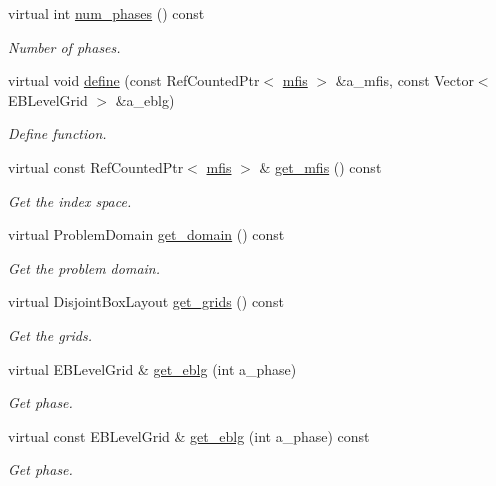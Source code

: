 \begin{DoxyCompactItemize}
virtual int \hyperlink{classMFLevelGrid_aa734d454aa492ca0d1a7ab1f0f7fbc58}{num\+\_\+phases} () const 
\begin{DoxyCompactList}\small\item\em Number of phases. \end{DoxyCompactList}\item 
virtual void \hyperlink{classMFLevelGrid_ae7cb324811b71bd16b4aa374c5fce1f9}{define} (const Ref\+Counted\+Ptr$<$ \hyperlink{classmfis}{mfis} $>$ \&a\+\_\+mfis, const Vector$<$ E\+B\+Level\+Grid $>$ \&a\+\_\+eblg)
\begin{DoxyCompactList}\small\item\em Define function. \end{DoxyCompactList}\item 
virtual const Ref\+Counted\+Ptr$<$ \hyperlink{classmfis}{mfis} $>$ \& \hyperlink{classMFLevelGrid_ac09adf47fdbff03d6eb3ae309212de44}{get\+\_\+mfis} () const 
\begin{DoxyCompactList}\small\item\em Get the index space. \end{DoxyCompactList}\item 
virtual Problem\+Domain \hyperlink{classMFLevelGrid_a43e3fce3f68c0ba93e67241928b2ba51}{get\+\_\+domain} () const 
\begin{DoxyCompactList}\small\item\em Get the problem domain. \end{DoxyCompactList}\item 
virtual Disjoint\+Box\+Layout \hyperlink{classMFLevelGrid_a44d383bf46d85ee02067ed2a986cb4a1}{get\+\_\+grids} () const 
\begin{DoxyCompactList}\small\item\em Get the grids. \end{DoxyCompactList}\item 
virtual E\+B\+Level\+Grid \& \hyperlink{classMFLevelGrid_a624af39657d18a1843277742e71740ca}{get\+\_\+eblg} (int a\+\_\+phase)
\begin{DoxyCompactList}\small\item\em Get phase. \end{DoxyCompactList}\item 
virtual const E\+B\+Level\+Grid \& \hyperlink{classMFLevelGrid_a8e14340d6455e8736ab665639a18a3e4}{get\+\_\+eblg} (int a\+\_\+phase) const 
\begin{DoxyCompactList}\small\item\em Get phase. \end{DoxyCompactList}\item 

\end{DoxyCompactItemize}
